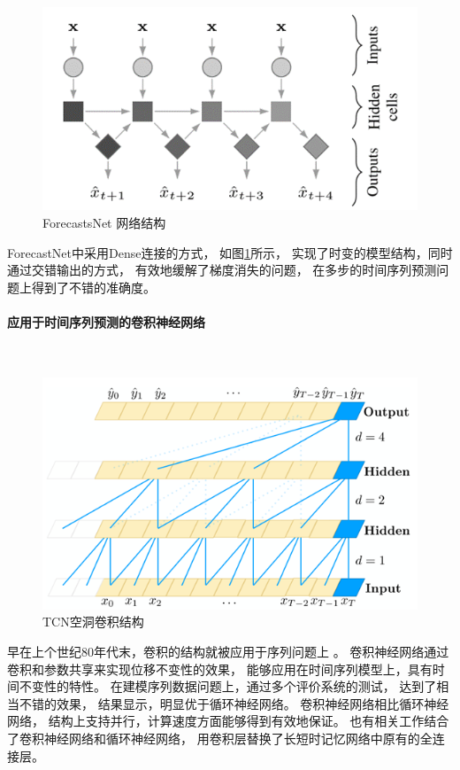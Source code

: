    \begin{figure}
      \centering
      \includegraphics[width=0.8\linewidth]{figures/ForecastsNet 网络结构.png}
      \caption{ForecastsNet 网络结构}
      \label{tab:ForecastsNet}
    \end{figure}

    ForecastNet\cite{dabrowski2020forecastnet}中采用Dense连接的方式，
    如图\ref{tab:ForecastsNet}所示，
    实现了时变的模型结构，同时通过交错输出的方式，
    有效地缓解了梯度消失的问题，
    在多步的时间序列预测问题上得到了不错的准确度。  
  
  \paragraph{应用于时间序列预测的卷积神经网络}~{}
  
    \begin{figure}
      \centering
      \includegraphics[width=0.8\linewidth]{figures/TCN空洞卷积结构.png}
      \caption{TCN空洞卷积结构}
      \label{tab:TCN}
    \end{figure}
    早在上个世纪80年代末，卷积的结构就被应用于序列问题上
    \cite{lecun1989backpropagation}。
    卷积神经网络通过卷积和参数共享来实现位移不变性的效果\cite{amari2003handbook}，
    能够应用在时间序列模型上，具有时间不变性的特性。
    在建模序列数据问题上，通过多个评价系统\cite{chung2014empirical}的测试，
    达到了相当不错的效果，
    结果显示，明显优于循环神经网络\cite{binkowski2018autoregressive}。
    卷积神经网络相比循环神经网络，
    结构上支持并行，计算速度方面能够得到有效地保证。
    也有相关工作\cite{shi2015convolutional}结合了卷积神经网络和循环神经网络，
    用卷积层替换了长短时记忆网络中原有的全连接层。

